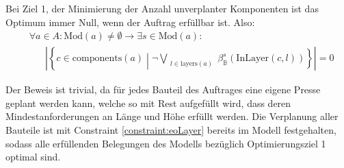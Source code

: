 Bei Ziel 1, der Minimierung der Anzahl unverplanter Komponenten ist das Optimum immer Null, wenn der Auftrag erfüllbar ist.
Also:
\begin{align*}
    &\hspace{0pt} \forall a \in A: \text{Mod}(a) \neq \emptyset \rightarrow \exists s \in \text{Mod}(a): \\
    &\hspace{20pt} \left\lvert \left\{ c \in \text{components}(a) \middle| \neg\bigvee\limits_{\substack{l \in \text{layers}(a)}} \beta_{\mathbb{B}}^{s}(\text{InLayer}(c,l)) \right\} \right\rvert = 0
\end{align*}

Der Beweis ist trivial, da für jedes Bauteil des Auftrages eine eigene Presse geplant werden kann, welche so mit Rest aufgefüllt wird,
dass deren Mindestanforderungen an Länge und Höhe erfüllt werden.
Die Verplanung aller Bauteile ist mit Constraint \ref{constraint:eoLayer} bereits im Modell festgehalten, sodass alle erfüllenden Belegungen des Modells
bezüglich Optimierungsziel 1 optimal sind.
